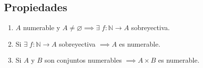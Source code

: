 \subsection{Propiedades}

\begin{enumerate}
    \item $A$ numerable y $A \neq \varnothing 
        \implies \exists \; f:\mathbb{N} \to A$ sobreyectiva.

    \item Si $\exists \; f: \mathbb{N} \to A$ sobreyectiva $\implies A$ es
        numerable.

    \item Si $A$ y $B$ son conjuntos numerables
        $\implies A \times B$ es numerable.
\end{enumerate}

\medskip 

